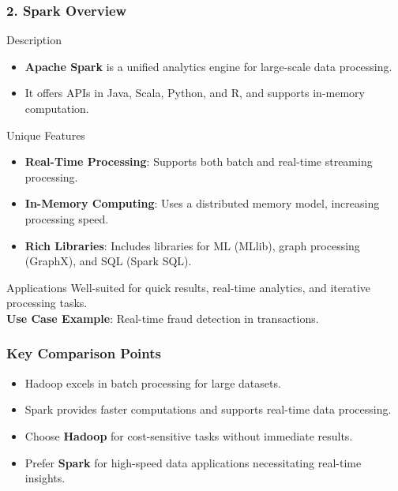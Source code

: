 \documentclass[aspectratio=169]{beamer}
\begin{document}
\begin{frame}[fragile]
    \frametitle{2. Spark Overview}
    \begin{block}{Description}
        \begin{itemize}
            \item \textbf{Apache Spark} is a unified analytics engine for large-scale data processing.
            \item It offers APIs in Java, Scala, Python, and R, and supports in-memory computation.
        \end{itemize}
    \end{block}
    
    \begin{block}{Unique Features}
        \begin{itemize}
            \item \textbf{Real-Time Processing}: Supports both batch and real-time streaming processing.
            \item \textbf{In-Memory Computing}: Uses a distributed memory model, increasing processing speed.
            \item \textbf{Rich Libraries}: Includes libraries for ML (MLlib), graph processing (GraphX), and SQL (Spark SQL).
        \end{itemize}
    \end{block}
    
    \begin{block}{Applications}
        Well-suited for quick results, real-time analytics, and iterative processing tasks.\\
        \textbf{Use Case Example}: Real-time fraud detection in transactions.
    \end{block}
\end{frame}

\begin{frame}[fragile]
    \frametitle{Key Comparison Points}
    \begin{itemize}
        \item Hadoop excels in batch processing for large datasets.
        \item Spark provides faster computations and supports real-time data processing.
        \item Choose \textbf{Hadoop} for cost-sensitive tasks without immediate results.
        \item Prefer \textbf{Spark} for high-speed data applications necessitating real-time insights.
    \end{itemize}
\end{frame}
\end{document}
